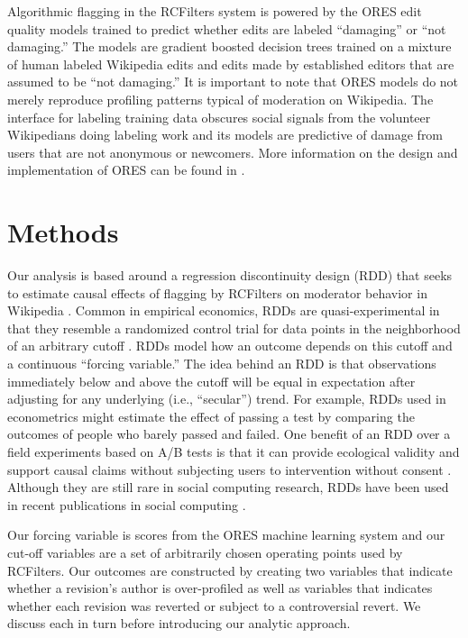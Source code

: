 \documentclass[format=acmsmall, natbib=true,  screen=true]{acmart}
\begin{document}
Algorithmic flagging in the RCFilters system is powered by the ORES edit quality models trained to predict whether edits are labeled ``damaging'' or ``not damaging.'' The models are gradient boosted decision trees trained on a mixture of human labeled Wikipedia edits and edits made by established editors that are assumed to be ``not damaging.''  It is important to note that ORES models do not merely reproduce profiling patterns typical of moderation on Wikipedia.  The interface for labeling training data obscures social signals from the volunteer Wikipedians doing labeling work and its models are predictive of damage from users that are not anonymous or newcomers. More information on the design and implementation of ORES can be found in \citet{halfaker_ores:_2019}. 

\section{Methods}


Our analysis is based around a regression discontinuity design (RDD) that seeks to estimate causal effects of flagging by RCFilters on moderator behavior in Wikipedia \cite{imbens_regression_2008, jacob_practical_2012, lee_regression_2010}. Common in empirical economics, RDDs are quasi-experimental in that they resemble a randomized control trial for data points in the neighborhood of an arbitrary cutoff \cite{jacob_practical_2012, lee_regression_2010}. 
RDDs model how an outcome depends on this cutoff and a continuous ``forcing variable.'' The idea behind an RDD is that observations immediately below and above the cutoff will be equal in expectation after adjusting for any underlying (i.e., ``secular'') trend. For example, RDDs used in econometrics might estimate the effect of passing a test by comparing the outcomes of people who barely passed and failed. 
One benefit of an RDD over a field experiments based on A/B tests is that it can provide ecological validity and support causal claims without subjecting users to intervention without consent \citep{lane_big_2015, jouhki_facebooks_2016}. 
Although they are still rare in social computing research, RDDs have been used in recent publications in social computing \citep{narayan_all_2019, hill_hidden_2020}.

Our forcing variable is scores from the ORES machine learning system and our cut-off variables are a set of arbitrarily chosen operating points used by RCFilters. Our outcomes are constructed by creating two variables that indicate whether a revision's author is over-profiled as well as variables that indicates whether each revision was reverted or subject to a controversial revert. We discuss each in turn before introducing our analytic approach.
\end{document}
